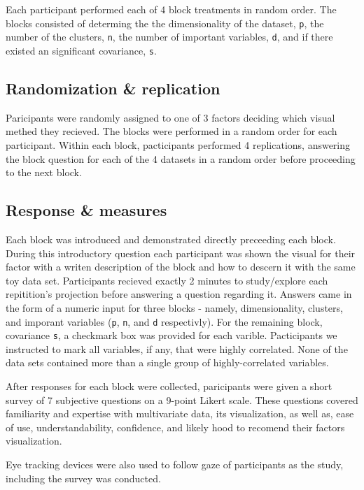 \documentclass[]{article}
\begin{document}
Each participant performed each of 4 block treatments in random order.
The blocks consisted of determing the the dimensionality of the dataset,
\texttt{p}, the number of the clusters, \texttt{n}, the number of
important variables, \texttt{d}, and if there existed an significant
covariance, \texttt{s}.

\hypertarget{randomization-replication}{%
\subsection{Randomization \&
replication}\label{randomization-replication}}

Paricipants were randomly assigned to one of 3 factors deciding which
visual methed they recieved. The blocks were performed in a random order
for each participant. Within each block, pacticipants performed 4
replications, answering the block question for each of the 4 datasets in
a random order before proceeding to the next block.

\hypertarget{response-measures}{%
\subsection{Response \& measures}\label{response-measures}}

Each block was introduced and demonstrated directly preceeding each
block. During this introductory question each participant was shown the
visual for their factor with a writen description of the block and how
to descern it with the same toy data set. Participants recieved exactly
2 minutes to study/explore each repitition's projection before answering
a question regarding it. Answers came in the form of a numeric input for
three blocks - namely, dimensionality, clusters, and imporant variables
(\texttt{p}, \texttt{n}, and \texttt{d} respectivly). For the remaining
block, covariance \texttt{s}, a checkmark box was provided for each
varible. Pacticipants we instructed to mark all variables, if any, that
were highly correlated. None of the data sets contained more than a
single group of highly-correlated variables.

After responses for each block were collected, paricipants were given a
short survey of 7 subjective questions on a 9-point Likert scale. These
questions covered familiarity and expertise with multivariate data, its
visualization, as well as, ease of use, understandability, confidence,
and likely hood to recomend their factors visualization.

Eye tracking devices were also used to follow gaze of participants as
the study, including the survey was conducted.
\end{document}
